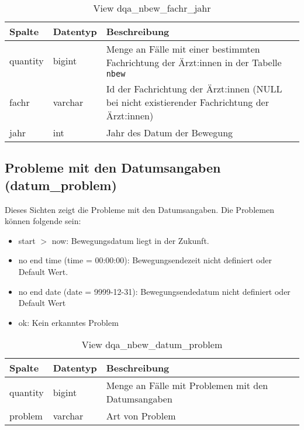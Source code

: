 \begin{table}[ht]
	\centering   
	\caption{View dqa\_nbew\_fachr\_jahr}
	\label{tab:bewFachrJ}
	\begin{tabular}{||l|l|p{10cm}||}   		
		\hline
		Spalte & Datentyp & Beschreibung \\ [0.5ex]
		\hline\hline
		quantity & bigint & Menge an Fälle mit einer bestimmten Fachrichtung der Ärzt:innen in der Tabelle \texttt{nbew}\\
		\hline
		fachr & varchar & Id der Fachrichtung der Ärzt:innen (NULL bei nicht existierender Fachrichtung der Ärzt:innen)\\
		\hline
		jahr & int &  Jahr des Datum der Bewegung \\
		\hline		
	\end{tabular}
\end{table}

\subsection{Probleme mit den Datumsangaben (datum\_problem)} \label{subsec:bewFalDat}

Dieses Sichten zeigt die Probleme mit den Datumsangaben. Die Problemen können folgende sein:

\begin{itemize}
	\item start $>$ now: Bewegungsdatum liegt in der Zukunft.
	\item no end time (time = 00:00:00): Bewegungsendezeit nicht definiert oder Default Wert.
	\item no end date (date = 9999-12-31): Bewegungsendedatum nicht definiert oder Default Wert
	\item ok: Kein erkanntes Problem
\end{itemize}
                          
\begin{table}[ht]
	\centering   
	\caption{View dqa\_nbew\_datum\_problem}
	\label{tab:bewFalDatI}
	\begin{tabular}{||l|l|p{10cm}||}   		
		\hline
		Spalte & Datentyp & Beschreibung \\ [0.5ex]
		\hline\hline
		quantity & bigint & Menge an Fälle mit Problemen mit den Datumsangaben \\
		\hline
		problem & varchar & Art von Problem \\
		\hline		
	\end{tabular}
\end{table}

